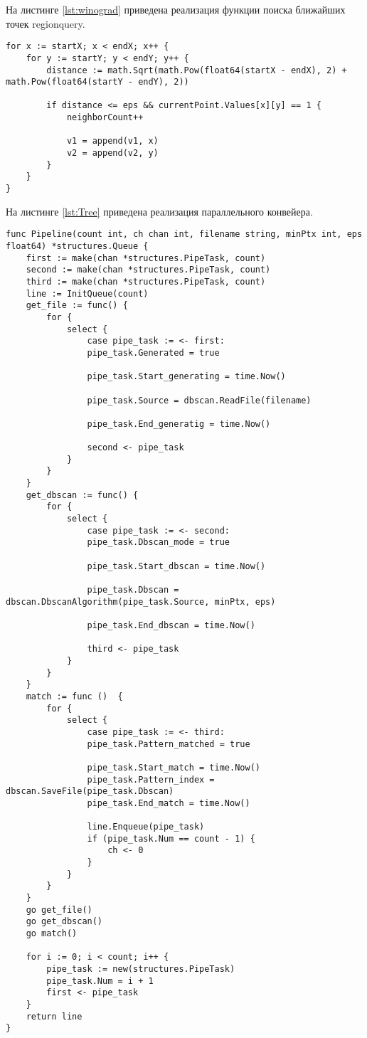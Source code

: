 На листинге \ref{lst:winograd} приведена реализация функции поиска ближайших точек regionquery.

\begin{lstlisting}[label=lst:winograd,caption=Реализация функции regionquery]
for x := startX; x < endX; x++ {
	for y := startY; y < endY; y++ {
		distance := math.Sqrt(math.Pow(float64(startX - endX), 2) + math.Pow(float64(startY - endY), 2))
		
		if distance <= eps && currentPoint.Values[x][y] == 1 {
			neighborCount++
			
			v1 = append(v1, x)
			v2 = append(v2, y)
		}
	}
}
\end{lstlisting}	

На листинге \ref{lst:Tree} приведена реализация параллельного конвейера.


\begin{lstlisting}[label=lst:Tree,caption=Реализация параллельного алгоритма DBSCAN]
func Pipeline(count int, ch chan int, filename string, minPtx int, eps float64) *structures.Queue {
	first := make(chan *structures.PipeTask, count)
	second := make(chan *structures.PipeTask, count)
	third := make(chan *structures.PipeTask, count)
	line := InitQueue(count)
	get_file := func() {
		for {
			select {
				case pipe_task := <- first:
				pipe_task.Generated = true
				
				pipe_task.Start_generating = time.Now()
				
				pipe_task.Source = dbscan.ReadFile(filename)
				
				pipe_task.End_generatig = time.Now()
				
				second <- pipe_task
			}
		}
	}
	get_dbscan := func() {
		for {
			select {
				case pipe_task := <- second:
				pipe_task.Dbscan_mode = true
				
				pipe_task.Start_dbscan = time.Now()
				
				pipe_task.Dbscan = dbscan.DbscanAlgorithm(pipe_task.Source, minPtx, eps)
				
				pipe_task.End_dbscan = time.Now()
				
				third <- pipe_task
			}
		}
	}
	match := func ()  {
		for {
			select {
				case pipe_task := <- third:
				pipe_task.Pattern_matched = true
				
				pipe_task.Start_match = time.Now()
				pipe_task.Pattern_index = dbscan.SaveFile(pipe_task.Dbscan)
				pipe_task.End_match = time.Now()
				
				line.Enqueue(pipe_task)
				if (pipe_task.Num == count - 1) {
					ch <- 0
				}
			}
		}
	}
	go get_file()
	go get_dbscan()
	go match()
	
	for i := 0; i < count; i++ {
		pipe_task := new(structures.PipeTask)
		pipe_task.Num = i + 1
		first <- pipe_task
	}
	return line
}
\end{lstlisting}	


